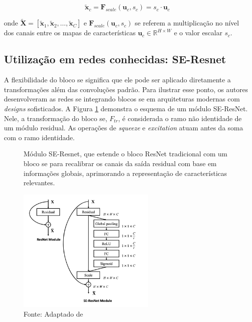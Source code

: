 \begin{equation}
\tilde{\mathbf{x}}_c = \mathbf{F}_{scale}(\mathbf{u}_c, s_c) = s_c \cdot \mathbf{u}_c 
\label{eq:se_scale}
\end{equation}

\noindent onde $\tilde{\mathbf{X}} = [\tilde{\mathbf{x}}_1, \tilde{\mathbf{x}}_2, \dots, \tilde{\mathbf{x}}_C]$ e $\mathbf{F}_{scale}(\mathbf{u}_c, s_c)$ se referem a multiplicação no nível dos canais entre os mapas de características $\mathbf{u}_c \in \mathbb{R}^{H \times W}$ e o valor escalar $s_c$.

\subsection{Utilização em redes conhecidas: SE-Resnet}
\label{subsec:util_resnet}

A flexibilidade do bloco \gls{se} significa que ele pode ser aplicado diretamente a transformações além das convoluções padrão. Para ilustrar esse ponto, os autores desenvolveram as redes \gls{se}  integrando blocos \gls{se} em arquiteturas modernas com \textit{designs} sofisticados. A Figura \ref{fig:fig026} demonstra o esquema de um módulo SE-ResNet. Nele, a transformação do bloco \gls{se}, $F_{tr}$, é considerada o ramo não identidade de um módulo residual. As operações de \textit{squeeze} e \textit{excitation} atuam antes da soma com o ramo identidade.


\begin{figure}[h!]
    \centering
    \captionsetup{width=0.98\textwidth, justification=justified}
    \caption{Módulo SE-Resnet, que estende o bloco ResNet tradicional com um bloco \gls{se} para recalibrar os canais da saída residual com base em informações globais, aprimorando a representação de características relevantes.}
    \includegraphics[width=0.6\textwidth]{figures/fig026.png}
    \caption*{Fonte: Adaptado de \cite{huSqueezeandExcitationNetworks2018}}
    \label{fig:fig026}
\end{figure}


